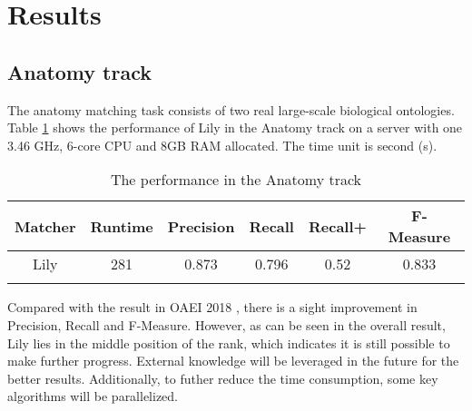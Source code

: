\documentclass[runningheads]{llncs}
\begin{document}
\section{Results}
\subsection{Anatomy track}
The anatomy matching task consists of two real large-scale biological ontologies. 
Table \ref{tab:perf_anatomy} shows the performance of Lily in the Anatomy track on a server with one 3.46 GHz, 6-core CPU and 8GB RAM allocated. The time unit is second (s). \par
\begin{table}[H]
\caption{The performance in the Anatomy track} \label{tab:perf_anatomy}
\centering
\begin{tabular}{c|c|c|c|c|c}
\Xhline{1.5pt}
Matcher & Runtime & Precision & Recall & Recall{+} & F-Measure \\ \hline
\Xhline{0.5pt}
Lily & 281 & 0.873 & 0.796 & 0.52 & 0.833 \\
\Xhline{1.5pt}
\end{tabular}
\end{table}
Compared with the result in OAEI 2018 \cite{lily_oaei2018}, there is a sight improvement in Precision, Recall and F-Measure. 
However, as can be seen in the overall result, Lily lies in the middle position of the rank, which indicates it is still possible to make further progress. 
External knowledge will be leveraged in the future for the better results.
Additionally, to futher reduce the time consumption, some key algorithms will be parallelized.
\end{document}
